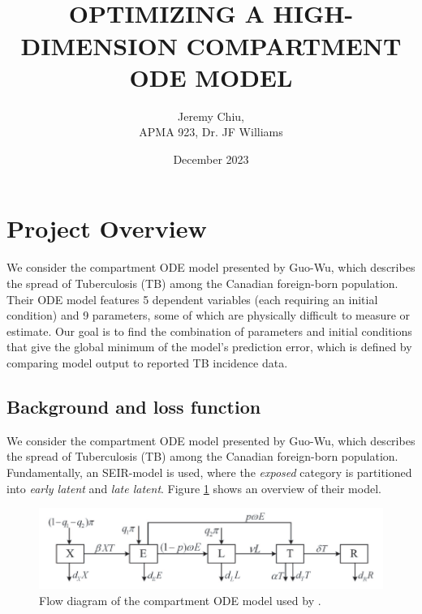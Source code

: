 \documentclass{article}
\begin{document}
\title{ \normalsize \textsc{}
	\\ [2.0cm]
	\Large \textbf{\uppercase{Optimizing a High-Dimension Compartment ODE Model}
}
}
\date{December 2023}
\author{Jeremy Chiu,\\APMA 923, Dr. JF Williams} 
	

\maketitle

\section{Project Overview}

We consider the compartment ODE model presented by Guo-Wu\cite{GuoWu}, which describes the spread of Tuberculosis (TB) among the Canadian foreign-born population.  Their ODE model features 5 dependent variables (each requiring an initial condition) and 9 parameters, some of which are physically difficult to measure or estimate.  Our goal is to find the combination of parameters and initial conditions that give the global minimum of the model's prediction error, which is defined by comparing model output to reported TB incidence data.

\subsection{Background and loss function}


We consider the compartment ODE model presented by Guo-Wu\cite{GuoWu}, which describes the spread of Tuberculosis (TB) among the Canadian foreign-born population.  Fundamentally, an SEIR-model is used, where the \textit{exposed} category is partitioned into \textit{early latent} and \textit{late latent}.  Figure \ref{fig:flow} shows an overview of their model.

\begin{figure}
	\centering 
		\includegraphics[scale=0.4]{xeltr flow diagram}
		\caption{Flow diagram of the compartment ODE model used by \cite{GuoWu}.}
		\label{fig:flow}
\end{figure}
\end{document}
